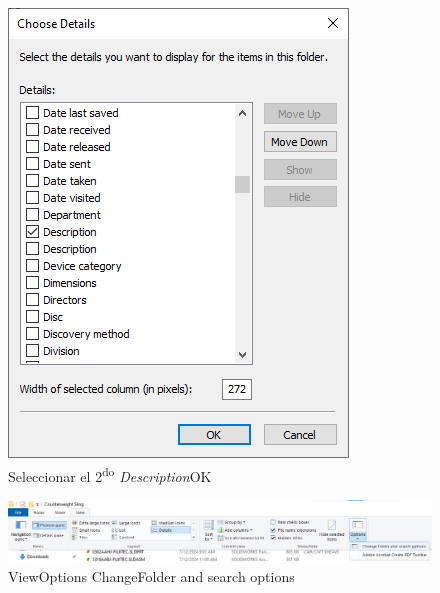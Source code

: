 \documentclass[12pt,letterpaper,final]{report}
\begin{document}
\begin{figure}[H]
	\centering
	\includegraphics[width=0.65\linewidth, height=0.5\textheight,keepaspectratio]{Imagenes/fe_prop_desc_02}
	\caption{Seleccionar el 2\textsuperscript{do} \emph{Description}\textrightarrow OK}
	\label{fig:fepropdesc02}
\end{figure}

\begin{figure}[H]
	\centering
	\includegraphics[width=0.95\linewidth, height=0.5\textheight,keepaspectratio]{Imagenes/fe_prop_desc_03}
	\caption{View\textrightarrow Options Change\textrightarrow Folder and search options}
	\label{fig:fepropdesc03}
\end{figure}
\end{document}
